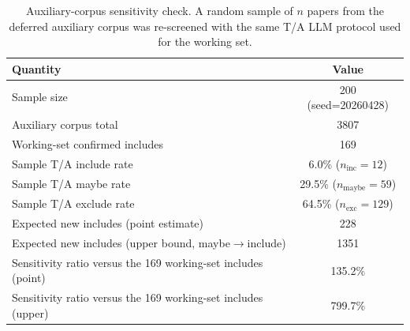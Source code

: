 \begin{table}[htbp]
\centering
\caption{Auxiliary-corpus sensitivity check. A random sample of $n$ papers from the deferred auxiliary corpus was re-screened with the same T/A LLM protocol used for the working set.}
\label{tab:sensitivity}
\begin{tabular}{lc}
\toprule
Quantity & Value \\
\midrule
Sample size & 200 (seed=20260428) \\
Auxiliary corpus total & 3807 \\
Working-set confirmed includes & 169 \\
Sample T/A include rate & 6.0\% ($n_{\text{inc}} = 12$) \\
Sample T/A maybe rate & 29.5\% ($n_{\text{maybe}} = 59$) \\
Sample T/A exclude rate & 64.5\% ($n_{\text{exc}} = 129$) \\
Expected new includes (point estimate) & 228 \\
Expected new includes (upper bound, maybe$\to$include) & 1351 \\
Sensitivity ratio versus the 169 working-set includes (point) & 135.2\% \\
Sensitivity ratio versus the 169 working-set includes (upper) & 799.7\% \\
\bottomrule
\end{tabular}
\end{table}